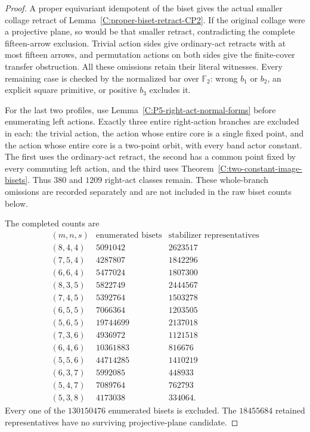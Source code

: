 \begin{proof}
A proper equivariant idempotent of the biset gives the actual
smaller collage retract of Lemma~\ref{C:proper-biset-retract-CP2}.
If the original collage were a projective plane, so would be
that smaller retract, contradicting the complete fifteen-arrow
exclusion.  Trivial action sides give ordinary-act retracts
with at most fifteen arrows, and permutation actions on both
sides give the finite-cover transfer obstruction.  All these
omissions retain their literal witnesses.  Every remaining case
is checked by the normalized bar over $\mathbb F_2$: wrong
$b_1$ or $b_2$, an explicit square primitive, or positive $b_3$
excludes it.

For the last two profiles, use
Lemma~\ref{C:P5-right-act-normal-forms} before enumerating left
actions.  Exactly three entire right-action branches are
excluded in each: the trivial action, the action whose entire
core is a single fixed point, and the action whose entire core
is a two-point orbit, with every band actor constant.
The first uses the ordinary-act retract, the second has a
common point fixed by every commuting left action, and the third
uses Theorem~\ref{C:two-constant-image-bisets}.
Thus $380$ and $1209$ right-act classes remain.  These whole-branch
omissions are recorded separately and are not included in the
raw biset counts below.

The completed counts are
\[
\begin{array}{c|r|r}
(m,n,s)&\text{enumerated bisets}&\text{stabilizer representatives}\\\hline
(8,4,4)&5091042&2623517\\
(7,5,4)&4287807&1842296\\
(6,6,4)&5477024&1807300\\
(8,3,5)&5822749&2444567\\
(7,4,5)&5392764&1503278\\
(6,5,5)&7066364&1203505\\
(5,6,5)&19744699&2137018\\
(7,3,6)&4936972&1121518\\
(6,4,6)&10361883&816676\\
(5,5,6)&44714285&1410219\\
(6,3,7)&5992085&448933\\
(5,4,7)&7089764&762793\\
(5,3,8)&4173038&334064.
\end{array}
\]
Every one of the $130150476$ enumerated bisets is excluded.
The $18455684$ retained representatives have no surviving
projective-plane candidate.
\end{proof}

